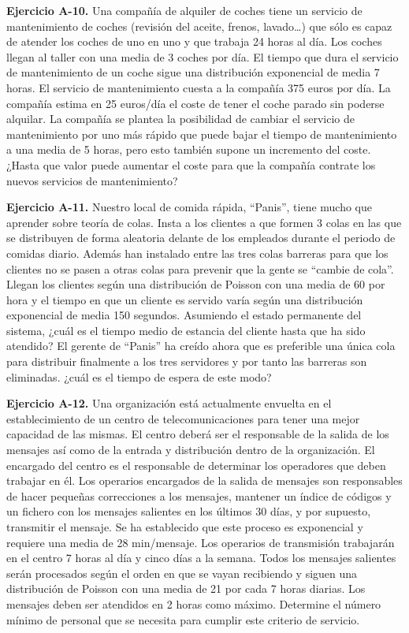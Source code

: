 \documentclass[
]{book}
\theoremstyle{definition}
\theoremstyle{definition}
\theoremstyle{definition}
\theoremstyle{definition}
\theoremstyle{remark}
\begin{document}
\textbf{Ejercicio A-10.} Una compañía de alquiler de coches tiene un servicio de mantenimiento de coches (revisión del aceite, frenos, lavado\ldots) que sólo es capaz de atender los coches de uno en uno y que trabaja 24 horas al día. Los coches llegan al taller con una media de 3 coches por día. El tiempo que dura el servicio de mantenimiento de un coche sigue una distribución exponencial de media 7 horas. El servicio de
mantenimiento cuesta a la compañía 375 euros por día. La compañía estima en 25 euros/día el coste de tener el coche parado sin poderse alquilar. La compañía se plantea la posibilidad de cambiar el servicio de mantenimiento por uno más rápido que puede bajar el tiempo de mantenimiento a una media de 5 horas, pero esto también supone un incremento del coste. ¿Hasta que valor puede aumentar el coste para que la compañía contrate los nuevos servicios de mantenimiento?

\textbf{Ejercicio A-11.} Nuestro local de comida rápida, ``Panis'', tiene mucho que aprender sobre teoría
de colas. Insta a los clientes a que formen 3 colas en las que se distribuyen de forma aleatoria delante de los empleados durante el periodo de comidas diario. Además han instalado entre las tres colas barreras para que los clientes no se pasen a otras colas para prevenir que la gente se ``cambie de cola''. Llegan los
clientes según una distribución de Poisson con una media de 60 por hora y el tiempo en que un cliente es servido varía según una distribución exponencial de media 150 segundos. Asumiendo el estado permanente del sistema, ¿cuál es el tiempo medio de estancia del cliente hasta que ha sido atendido? El gerente de ``Panis'' ha creído ahora que es preferible una única cola para distribuir finalmente a los tres servidores y por tanto las barreras son eliminadas. ¿cuál es el tiempo de espera de este modo?

\textbf{Ejercicio A-12.} Una organización está actualmente envuelta en el establecimiento de un centro de telecomunicaciones para tener una mejor capacidad de las mismas. El centro deberá ser el responsable de la salida de los mensajes así como de la entrada y distribución dentro de la organización. El encargado del centro es el responsable de determinar los operadores que deben trabajar en él. Los operarios encargados de la salida de mensajes son responsables de hacer pequeñas correcciones a los mensajes, mantener un índice de códigos y un fichero con los mensajes salientes en los últimos 30 días, y por supuesto, transmitir el mensaje. Se ha establecido que este proceso es exponencial y requiere una media de 28 min/mensaje. Los operarios de transmisión trabajarán en el centro 7 horas al día y cinco días a la semana. Todos los mensajes salientes serán procesados según el orden en que se vayan recibiendo y siguen una distribución de Poisson con una media de 21 por cada 7 horas diarias. Los mensajes deben ser atendidos en 2 horas como máximo. Determine el número mínimo de personal que se necesita para cumplir este criterio de servicio.
\end{document}
